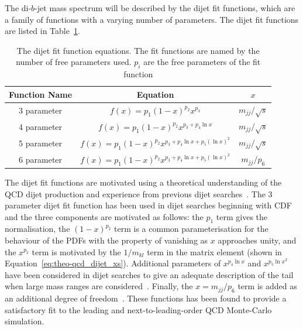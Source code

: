 

The di-$b$-jet mass spectrum will be described by the dijet fit functions,
which are a family of functions with a varying number of parameters.
The dijet fit functions are listed in Table~\ref{tab:bkg-fit}.


{\renewcommand{\arraystretch}{1.2}
\begin{table}[!thb]
\centering
\begin{tabular}{|c||c|c|}
  \hline
  Function Name & Equation                                          & $x$ \\
  \hline
  3 parameter   & $f(x)=p_1(1-x)^{p_2}x^{p_3}$                         & $m_{jj}/\sqrt{s}$ \\
  4 parameter   & $f(x)=p_1(1-x)^{p_2}x^{p_3+p_4\ln{x}}$                &$m_{jj}/\sqrt{s}$\\
  5 parameter   & $f(x)=p_1(1-x)^{p_2}x^{p_3+p_4\ln{x}+p_5(\ln{x})^{2}}$   & $m_{jj}/\sqrt{s}$\\ 
  6 parameter   & $f(x)=p_1(1-x)^{p_2}x^{p_3+p_4\ln{x}+p_5(\ln{x})^{2}}$   &  $m_{jj}/p_6$\\ 
  \hline
\end{tabular}
\caption{The dijet fit function equations. The fit functions are named by the number of free parameters used. $p_{i}$ are the free parameters of the fit function}
\label{tab:bkg-fit}
\end{table}}

The dijet fit functions are motivated using a theoretical understanding of the QCD dijet production
and experience from previous dijet searches~\cite{theo-dijet_harris}.
The 3 parameter dijet fit function has been used in dijet searches beginning with CDF~\cite{dijet-CDF_3par}
and the three components are motivated as follows:
the $p_1$ term gives the normalisation,
the $(1-x)^{p_2}$ term is a common parameterisation for the behaviour of the PDFs with the property of vanishing as $x$ approaches unity,
and the $x^{p_3}$ term is motivated by the $1/m_{kl}$ term in the matrix element (shown in Equation~\ref{eq:theo-qcd_dijet_xs}).
Additional parameters of $x^{p_4\ln{x}}$ and $x^{p_5\ln{x}^{2}}$ have been considered in dijet searches to give an adequate description of the tail
when large mass ranges are considered~\cite{dijet-CDF_4par,dijet-mori16_int}.
Finally, the $x=m_{jj}/p_6$ term is added as an additional degree of freedom~\cite{det-thesis_kate}.
These functions has been found to provide a satisfactory fit to the leading and next-to-leading-order QCD Monte-Carlo simulation.


